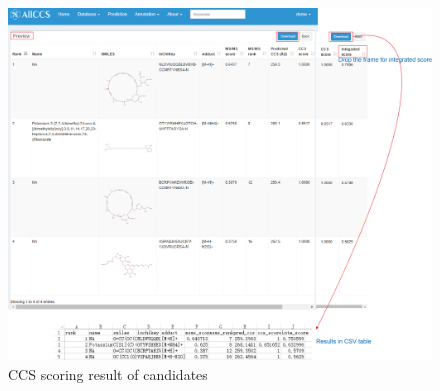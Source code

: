 \documentclass[12pt,]{book}
\begin{document}
\begin{figure}

{\centering \includegraphics{images/chapter4/figure4.6candidate_rank_scoring} 

}

\caption{CCS scoring result of candidates}\label{fig:figure4d6}
\end{figure}


\end{document}
